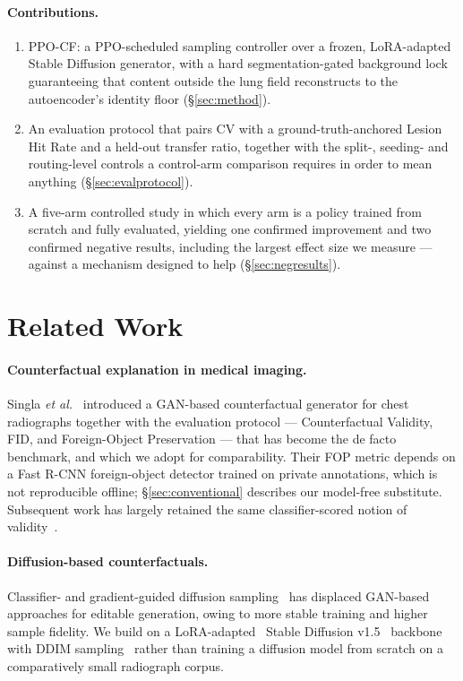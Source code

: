 \documentclass[10pt,twocolumn,letterpaper]{article}
\newcommand{\method}{\textsc{PPO-CF}}
\begin{document}
\paragraph{Contributions.}
\begin{enumerate}[leftmargin=*,itemsep=1pt,topsep=2pt]
  \item \method{}: a PPO-scheduled sampling controller over a frozen,
        LoRA-adapted Stable Diffusion generator, with a hard
        segmentation-gated background lock guaranteeing that content
        outside the lung field reconstructs to the autoencoder's
        identity floor (\S\ref{sec:method}).
  \item An evaluation protocol that pairs CV with a ground-truth-anchored
        Lesion Hit Rate and a held-out transfer ratio, together with the
        split-, seeding- and routing-level controls a control-arm
        comparison requires in order to mean anything
        (\S\ref{sec:evalprotocol}).
  \item A five-arm controlled study in which every arm is a policy
        trained from scratch and fully evaluated, yielding one confirmed
        improvement and two confirmed negative results, including the
        largest effect size we measure --- against a mechanism designed
        to help (\S\ref{sec:negresults}).
\end{enumerate}

\section{Related Work}

\paragraph{Counterfactual explanation in medical imaging.} Singla
\emph{et al.}~\cite{singla2022} introduced a GAN-based counterfactual
generator for chest radiographs together with the evaluation protocol
--- Counterfactual Validity, FID, and Foreign-Object Preservation ---
that has become the de facto benchmark, and which we adopt for
comparability. Their FOP metric depends on a Fast R-CNN foreign-object
detector trained on private annotations, which is not reproducible
offline; \S\ref{sec:conventional} describes our model-free substitute.
Subsequent work has largely retained the same classifier-scored notion of
validity~\cite{jeanneret2022dime,jeanneret2023ace,augustin2022dvce}.

\paragraph{Diffusion-based counterfactuals.} Classifier- and
gradient-guided diffusion sampling~\cite{dhariwal2021diffusion,meng2022sdedit,preechakul2022diffae}
has displaced GAN-based approaches for editable generation, owing to more
stable training and higher sample fidelity. We build on a
LoRA-adapted~\cite{hu2021lora} Stable Diffusion v1.5~\cite{rombach2022}
backbone with DDIM sampling~\cite{song2021ddim} rather than training a
diffusion model from scratch on a comparatively small radiograph corpus.
\end{document}

